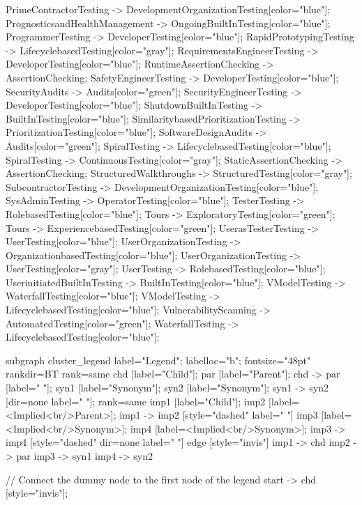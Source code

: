 \documentclass{article}
\begin{document}
{PrimeContractorTesting -> DevelopmentOrganizationTesting[color="blue"];
PrognosticsandHealthManagement -> OngoingBuiltInTesting[color="blue"];
ProgrammerTesting -> DeveloperTesting[color="blue"];
RapidPrototypingTesting -> LifecyclebasedTesting[color="gray"];
RequirementsEngineerTesting -> DeveloperTesting[color="blue"];
RuntimeAssertionChecking -> AssertionChecking;
SafetyEngineerTesting -> DeveloperTesting[color="blue"];
SecurityAudits -> Audits[color="green"];
SecurityEngineerTesting -> DeveloperTesting[color="blue"];
ShutdownBuiltInTesting -> BuiltInTesting[color="blue"];
SimilaritybasedPrioritizationTesting -> PrioritizationTesting[color="blue"];
SoftwareDesignAudits -> Audits[color="green"];
SpiralTesting -> LifecyclebasedTesting[color="blue"];
SpiralTesting -> ContinuousTesting[color="gray"];
StaticAssertionChecking -> AssertionChecking;
StructuredWalkthroughs -> StructuredTesting[color="gray"];
SubcontractorTesting -> DevelopmentOrganizationTesting[color="blue"];
SysAdminTesting -> OperatorTesting[color="blue"];
TesterTesting -> RolebasedTesting[color="blue"];
Tours -> ExploratoryTesting[color="green"];
Tours -> ExperiencebasedTesting[color="green"];
UserasTesterTesting -> UserTesting[color="blue"];
UserOrganizationTesting -> OrganizationbasedTesting[color="blue"];
UserOrganizationTesting -> UserTesting[color="gray"];
UserTesting -> RolebasedTesting[color="blue"];
UserinitiatedBuiltInTesting -> BuiltInTesting[color="blue"];
VModelTesting -> WaterfallTesting[color="blue"];
VModelTesting -> LifecyclebasedTesting[color="blue"];
VulnerabilityScanning -> AutomatedTesting[color="green"];
WaterfallTesting -> LifecyclebasedTesting[color="blue"];

subgraph cluster_legend {
    label="Legend";
    labelloc="b";
    fontsize="48pt"
    rankdir=BT
    {
        rank=same
        chd [label="Child"];
        par [label="Parent"];
        chd -> par [label="                "];
        syn1 [label="Synonym"];
        syn2 [label="Synonym"];
        syn1 -> syn2 [dir=none label="                "];
    }
    {
        rank=same
        imp1 [label="Child"];
        imp2 [label=<Implied<br/>Parent>];
        imp1 -> imp2 [style="dashed" label="                "]
        imp3 [label=<Implied<br/>Synonym>];
        imp4 [label=<Implied<br/>Synonym>];
        imp3 -> imp4 [style="dashed" dir=none label="                "]
    }
    edge [style="invis"]
    imp1 -> chd
    imp2 -> par
    imp3 -> syn1
    imp4 -> syn2
}

// Connect the dummy node to the first node of the legend
start -> chd [style="invis"];
}
\end{document}

